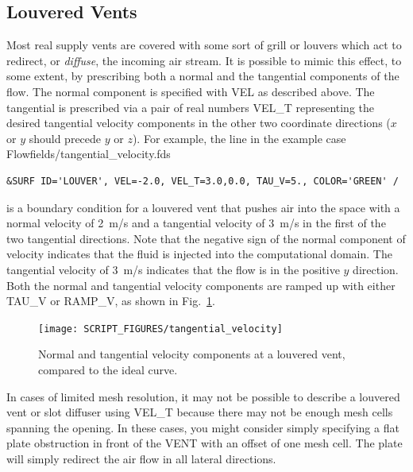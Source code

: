 \documentclass[11pt]{book}
\begin{document}
\subsection{Louvered Vents}
\label{info:louvers}
\label{tangential_velocity}

Most real supply vents are covered with some sort of grill or louvers which act to redirect, or {\em diffuse}, the incoming air stream. It is possible to mimic this effect, to some extent, by prescribing both a normal and the tangential components of the flow. The normal component is specified with {\ct VEL} as described above. The tangential is prescribed via a pair of real numbers {\ct VEL\_T} representing the desired tangential velocity components in the other two coordinate directions ($x$ or $y$ should precede $y$ or $z$). For example, the line in the example case {\ct Flowfields/tangential\_velocity.fds}
\begin{lstlisting}
&SURF ID='LOUVER', VEL=-2.0, VEL_T=3.0,0.0, TAU_V=5., COLOR='GREEN' /
\end{lstlisting}
is a boundary condition for a louvered vent that pushes air into the space with a normal velocity of 2~m/s and a tangential velocity of 3~m/s in the first of the two tangential directions. Note that the negative sign of the normal component of velocity indicates that the fluid is injected into the computational domain. The tangential velocity of 3~m/s indicates that the flow is in the positive $y$ direction. Both the normal and tangential velocity components are ramped up with either {\ct TAU\_V} or {\ct RAMP\_V}, as shown in Fig.~\ref{fig:tangential_velocity}.

\begin{figure}[ht!]
\begin{center}
\texttt{[image: SCRIPT\_FIGURES/tangential\_velocity]}
\caption[The {\ct tangential\_velocity} test case]{Normal and tangential velocity components at a louvered vent, compared to the ideal curve.}
\label{fig:tangential_velocity}
\end{center}
\end{figure}

In cases of limited mesh resolution, it may not be possible to describe a louvered vent or slot diffuser using {\ct VEL\_T} because there may not be enough mesh cells spanning the opening. In these cases, you might consider simply specifying a flat plate obstruction in front of the {\ct VENT} with an offset of one mesh cell. The plate will simply redirect the air flow in all lateral directions.
\end{document}
